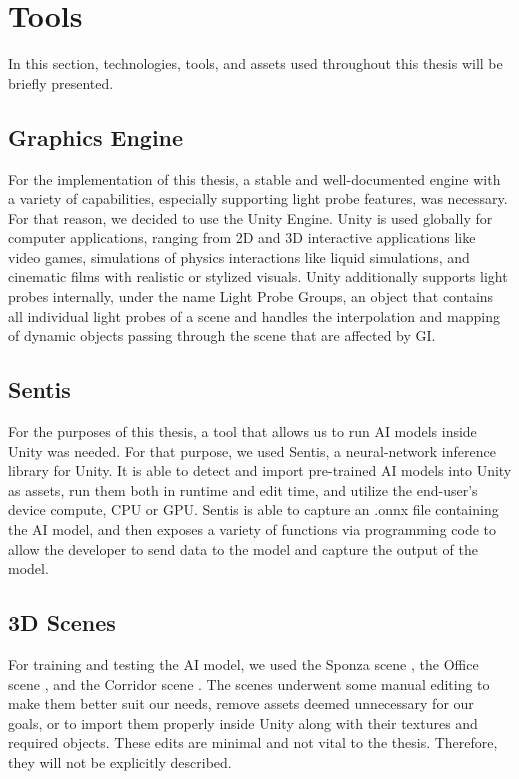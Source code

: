 \section{Tools} %
In this section, technologies, tools, and assets used throughout this thesis will be briefly presented.

\subsection{Graphics Engine}
For the implementation of this thesis, a stable and well-documented engine with a variety of capabilities, especially supporting light probe features, was necessary. For that reason, we decided to use the Unity Engine. Unity is used globally for computer applications, ranging from 2D and 3D interactive applications like video games, simulations of physics interactions like liquid simulations, and cinematic films with realistic or stylized visuals. Unity additionally supports light probes internally, under the name Light Probe Groups, an object that contains all individual light probes of a scene and handles the interpolation and mapping of dynamic objects passing through the scene that are affected by GI.

\subsection{Sentis}
For the purposes of this thesis, a tool that allows us to run AI models inside Unity was needed. For that purpose, we used Sentis, a neural-network inference library for Unity. It is able to detect and import pre-trained AI models into Unity as assets, run them both in runtime and edit time, and utilize the end-user's device compute, CPU or GPU. Sentis is able to capture an .onnx file containing the AI model, and then exposes a variety of functions via programming code to allow the developer to send data to the model and capture the output of the model.

\subsection{3D Scenes}
For training and testing the AI model, we used the Sponza scene \parencite{Sponza2017}, the Office scene \parencite{Office2021}, and the Corridor scene \parencite{Corridor2021}. The scenes underwent some manual editing to make them better suit our needs, remove assets deemed unnecessary for our goals, or to import them properly inside Unity along with their textures and required objects. These edits are minimal and not vital to the thesis. Therefore, they will not be explicitly described.

